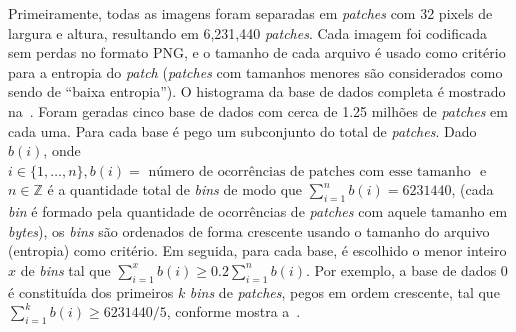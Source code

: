 Primeiramente, todas as imagens foram separadas em \textit{patches} com 32 pixels de largura e altura, resultando em 6,231,440 \textit{patches}. Cada imagem foi codificada sem perdas no formato \acrshort{PNG}, e o tamanho de cada arquivo é usado como critério para a entropia do \textit{patch} (\textit{patches} com tamanhos menores são considerados como sendo de ``baixa entropia''). O histograma da base de dados completa é mostrado na~.
Foram geradas cinco base de dados com cerca de 1.25 milhões de \textit{patches} em cada uma. Para cada base é pego um subconjunto do total de \textit{patches}. Dado $b(i)$, onde $i \in \{1,\dots,n\}, b(i) = \text{ número de ocorrências de patches com esse tamanho }$ e $n \in \mathbb{Z}$ é a quantidade total de \textit{bins} de modo que $\sum_{i=1}^{n}b(i) = 6231440$, (cada \textit{bin} é formado pela quantidade de ocorrências de \textit{patches} com aquele tamanho em \textit{bytes}), os \textit{bins} são ordenados de forma crescente usando o tamanho do arquivo (entropia) como critério. Em seguida, para cada base, é escolhido o menor inteiro $x$ de \textit{bins} tal que $\sum_{i=1}^{x}b(i) \geq 0.2\sum_{i=1}^{n}b(i)$. Por exemplo, a base de dados 0 é constituída dos primeiros $k$ \textit{bins} de \textit{patches}, pegos em ordem crescente, tal que $\sum_{i=1}^{k}b(i) \geq 6231440/5$, conforme mostra a~.

